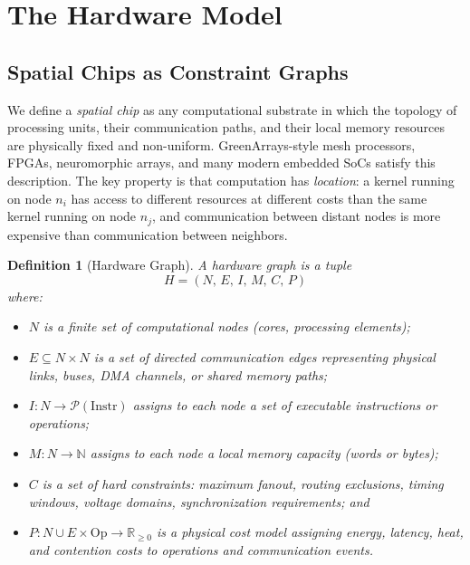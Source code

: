 \documentclass[11pt, a4paper]{article}
\newtheorem{definition}{Definition}
\begin{document}
\section{The Hardware Model}

\subsection{Spatial Chips as Constraint Graphs}

We define a \emph{spatial chip} as any computational substrate in which the topology
of processing units, their communication paths, and their local memory resources are
physically fixed and non-uniform. GreenArrays-style mesh processors, FPGAs, neuromorphic
arrays, and many modern embedded SoCs satisfy this description. The key property is that
computation has \emph{location}: a kernel running on node $n_i$ has access to different
resources at different costs than the same kernel running on node $n_j$, and communication
between distant nodes is more expensive than communication between neighbors.

\begin{definition}[Hardware Graph]
A \emph{hardware graph} is a tuple
\[
H = (N,\, E,\, I,\, M,\, C,\, P)
\]
where:
\begin{itemize}
  \item $N$ is a finite set of \emph{computational nodes} (cores, processing elements);
  \item $E \subseteq N \times N$ is a set of directed \emph{communication edges}
        representing physical links, buses, DMA channels, or shared memory paths;
  \item $I : N \to \mathcal{P}(\text{Instr})$ assigns to each node a set of executable
        instructions or operations;
  \item $M : N \to \mathbb{N}$ assigns to each node a local memory capacity (words or bytes);
  \item $C$ is a set of \emph{hard constraints}: maximum fanout, routing exclusions,
        timing windows, voltage domains, synchronization requirements; and
  \item $P : N \cup E \times \text{Op} \to \mathbb{R}_{\geq 0}$ is a \emph{physical cost model}
        assigning energy, latency, heat, and contention costs to operations and
        communication events.
\end{itemize}
\end{definition}
\end{document}
